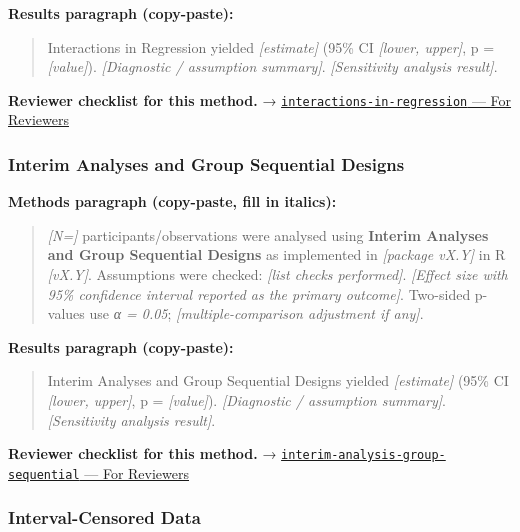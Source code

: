 \documentclass[
]{article}
\begin{document}
\textbf{Results paragraph (copy-paste):}

\begin{quote}
Interactions in Regression yielded \emph{{[}estimate{]}} (95\% CI
\emph{{[}lower, upper{]}}, p = \emph{{[}value{]}}). \emph{{[}Diagnostic
/ assumption summary{]}}. \emph{{[}Sensitivity analysis result{]}}.
\end{quote}

\textbf{Reviewer checklist for this method.} →
\href{../chapters/07-regression/interactions-in-regression.Rmd\#for-reviewers}{\texttt{interactions-in-regression}
--- For Reviewers}

\subsubsection{Interim Analyses and Group Sequential
Designs}\label{interim-analyses-and-group-sequential-designs}

\textbf{Methods paragraph (copy-paste, fill in italics):}

\begin{quote}
\emph{{[}N={]}} participants/observations were analysed using
\textbf{Interim Analyses and Group Sequential Designs} as implemented in
\emph{{[}package vX.Y{]}} in R \emph{{[}vX.Y{]}}. Assumptions were
checked: \emph{{[}list checks performed{]}}. \emph{{[}Effect size with
95\% confidence interval reported as the primary outcome{]}}. Two-sided
p-values use \emph{α = 0.05}; \emph{{[}multiple-comparison adjustment if
any{]}}.
\end{quote}

\textbf{Results paragraph (copy-paste):}

\begin{quote}
Interim Analyses and Group Sequential Designs yielded
\emph{{[}estimate{]}} (95\% CI \emph{{[}lower, upper{]}}, p =
\emph{{[}value{]}}). \emph{{[}Diagnostic / assumption summary{]}}.
\emph{{[}Sensitivity analysis result{]}}.
\end{quote}

\textbf{Reviewer checklist for this method.} →
\href{../chapters/14-clinical/interim-analysis-group-sequential.Rmd\#for-reviewers}{\texttt{interim-analysis-group-sequential}
--- For Reviewers}

\subsubsection{Interval-Censored Data}\label{interval-censored-data}
\end{document}
